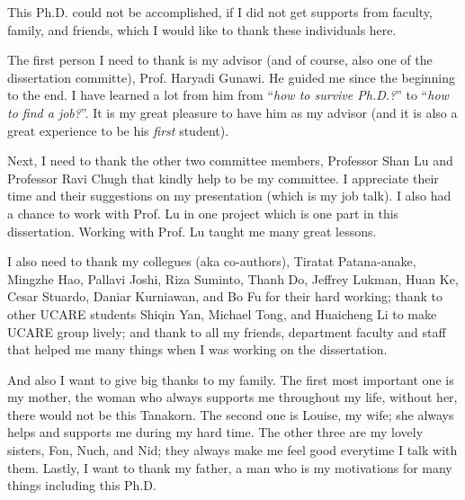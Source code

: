 This Ph.D. could not be accomplished, if I did not get supports from faculty,
family, and friends, which I would like to thank these individuals here.

The first person I need to thank is my advisor (and of course, also one of the
dissertation committe), Prof. Haryadi Gunawi. He guided me since the beginning
to the end. I have learned a lot from him from ``\textit{how to survive
Ph.D.?}'' to ``\textit{how to find a job?}''. It is my great pleasure to have him
as my advisor (and it is also a great experience to be his \textit{first}
student).

Next, I need to thank the other two committee members, Professor Shan Lu and
Professor Ravi Chugh that kindly help to be my committee. I appreciate their
time and their suggestions on my presentation (which is my job talk). I also had
a chance to work with Prof. Lu in one project which is one part in this
dissertation.  Working with Prof. Lu taught me many great lessons.

I also need to thank my collegues (aka co-authors), Tiratat Patana-anake,
Mingzhe Hao, Pallavi Joshi, Riza Suminto, Thanh Do, Jeffrey Lukman, Huan Ke,
Cesar Stuardo, Daniar Kurniawan, and Bo Fu for their hard working; thank to
other UCARE students Shiqin Yan, Michael Tong, and Huaicheng Li to make UCARE
group lively; and thank to all my friends, department faculty and staff that
helped me many things when I was working on the dissertation.

And also I want to give big thanks to my family. The first most important one is
my mother, the woman who always supports me throughout my life, without her,
there would not be this Tanakorn. The second one is Louise, my wife; she always
helps and supports me during my hard time. The other three are my lovely
sisters, Fon, Nuch, and Nid; they always make me feel good everytime I talk with
them. Lastly, I want to thank my father, a man who is my motivations for many
things including this Ph.D.

